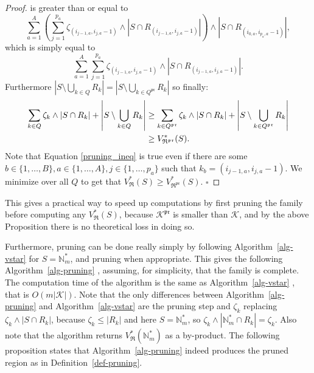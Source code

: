 \documentclass[
  11pt,
  a4paper,
]{article}
\theoremstyle{plain}
\theoremstyle{plain}
\theoremstyle{plain}
\theoremstyle{definition}
\theoremstyle{definition}
\theoremstyle{remark}
\begin{document}
\begin{proof}
is greater than or equal to \begin{equation*}
\sum_{a=1}^A\left(  \sum_{j=1}^{p_a}\zeta_{(i_{j-1,a},i_{j,a}-1)} \wedge |S\cap R_{(i_{j-1,a}, i_{j,a}-1)}| \right)\wedge |S\cap R_{(i_{0,a}, i_{p_a,a}-1)}| ,
\end{equation*} which is simply equal to \begin{equation*}
 \sum_{a=1}^A  \sum_{j=1}^{p_a}\zeta_{(i_{j-1,a},i_{j,a}-1)} \wedge |S\cap R_{(i_{j-1,a}, i_{j,a}-1)}|.
\end{equation*} Furthermore
\(\left|S\setminus\bigcup_{k\in Q} R_k\right|= \left|S\setminus\bigcup_{k\in Q^{\mathfrak{pr}}} R_k\right|\)
so finally: \begin{align}
\sum_{k\in Q}\zeta_k\wedge|S\cap R_k|+\left| S\setminus\bigcup_{k\in Q} R_k   \right| &\geq \sum_{k\in Q^{\mathfrak{pr}}}\zeta_k\wedge|S\cap R_k|+\left| S\setminus\bigcup_{k\in Q^{\mathfrak{pr}}} R_k   \right|   \label{pruning_ineq}\\
&\geq V^*_{\mathfrak{R}^{\mathfrak{pr}}}(S). \notag
\end{align} Note that Equation \eqref{pruning_ineq} is true even if
there are some
\(b\in\{ 1,\dotsc,B\}, a\in\{ 1,\dotsc,A\}, j\in\{ 1,\dotsc,p_a\}\) such
that \(k_b=(i_{j-1,a}, i_{j,a}-1)\). We minimize over all \(Q\) to get
that
\(V^*_{\mathfrak{R}}(S)\geq V^*_{\mathfrak{R}^{\mathfrak{pr}}}(S)\).
\(\square\)
\end{proof}

This gives a practical way to speed up computations by first pruning the
family before computing any \(V^*_{\mathfrak{R}}(S)\), because
\(\mathcal{K}^{\mathfrak{pr}}\) is smaller than \(\mathcal{K}\), and by
the above Proposition there is no theoretical loss in doing so.

Furthermore, pruning can be done really simply by following
 Algorithm~\ref{alg-vstar}  for \(S=\mathbb{N}_m^*\), and pruning when
appropriate. This gives the following  Algorithm~\ref{alg-pruning} ,
assuming, for simplicity, that the family is complete. The computation
time of the algorithm is the same as  Algorithm~\ref{alg-vstar} , that
is \(O(m|\mathcal{K}|)\). Note that the only differences between
 Algorithm~\ref{alg-pruning}  and  Algorithm~\ref{alg-vstar}  are the
pruning step and \(\zeta_k\) replacing \(\zeta_k\wedge|S\cap R_k|\),
because \(\zeta_k\leq|R_k|\) and here \(S=\mathbb{N}_m^*\), so
\(\zeta_k\wedge|\mathbb{N}_m^*\cap R_k|=\zeta_k\). Also note that the
algorithm returns \(V^*_{\mathfrak{R}}(\mathbb{N}_m^*)\) as a
by-product. The following proposition states that
 Algorithm~\ref{alg-pruning}  indeed produces the pruned region as in
Definition~\ref{def-pruning}.
\end{document}
